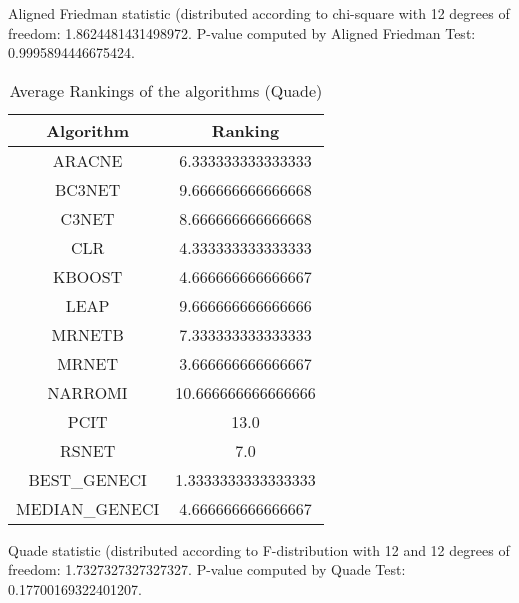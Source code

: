 \documentclass[a4paper,10pt]{article}
\begin{document}
\begin{landscape}
Aligned Friedman statistic (distributed according to chi-square with 12 degrees of freedom: 1.8624481431498972. 
P-value computed by Aligned Friedman Test: 0.9995894446675424.\newline


\newpage

\begin{table}[!htp]
\centering
\caption{Average Rankings of the algorithms (Quade)
}\begin{tabular}{c|c}
Algorithm&Ranking\\
\hline
ARACNE&6.333333333333333\\
BC3NET&9.666666666666668\\
C3NET&8.666666666666668\\
CLR&4.333333333333333\\
KBOOST&4.666666666666667\\
LEAP&9.666666666666666\\
MRNETB&7.333333333333333\\
MRNET&3.666666666666667\\
NARROMI&10.666666666666666\\
PCIT&13.0\\
RSNET&7.0\\
BEST_GENECI&1.3333333333333333\\
MEDIAN_GENECI&4.666666666666667\\
\end{tabular}
\end{table}
Quade statistic (distributed according to F-distribution with 12 and 12 degrees of freedom: 1.7327327327327327. 
P-value computed by Quade Test: 0.17700169322401207.\newline


\newpage


\end{landscape}
\end{document}
